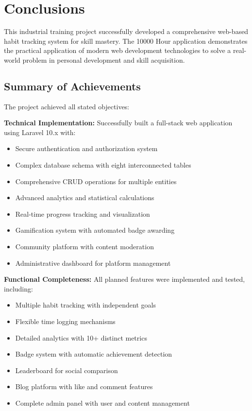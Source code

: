 \documentclass[12pt,a4paper]{report}
\newcommand{\JustifiedNormal}{\fontsize{12}{14}\selectfont\justifying\setlength{\parindent}{0pt}}
\begin{document}
\section{Conclusions}
\JustifiedNormal
This industrial training project successfully developed a comprehensive web-based habit tracking system for skill mastery. The 10000 Hour application demonstrates the practical application of modern web development technologies to solve a real-world problem in personal development and skill acquisition.

\subsection{Summary of Achievements}
\JustifiedNormal
The project achieved all stated objectives:

\textbf{Technical Implementation:} Successfully built a full-stack web application using Laravel 10.x with:
\begin{itemize}
  \item Secure authentication and authorization system
  \item Complex database schema with eight interconnected tables
  \item Comprehensive CRUD operations for multiple entities
  \item Advanced analytics and statistical calculations
  \item Real-time progress tracking and visualization
  \item Gamification system with automated badge awarding
  \item Community platform with content moderation
  \item Administrative dashboard for platform management
\end{itemize}

\textbf{Functional Completeness:} All planned features were implemented and tested, including:
\begin{itemize}
  \item Multiple habit tracking with independent goals
  \item Flexible time logging mechanisms
  \item Detailed analytics with 10+ distinct metrics
  \item Badge system with automatic achievement detection
  \item Leaderboard for social comparison
  \item Blog platform with like and comment features
  \item Complete admin panel with user and content management
\end{itemize}
\end{document}
